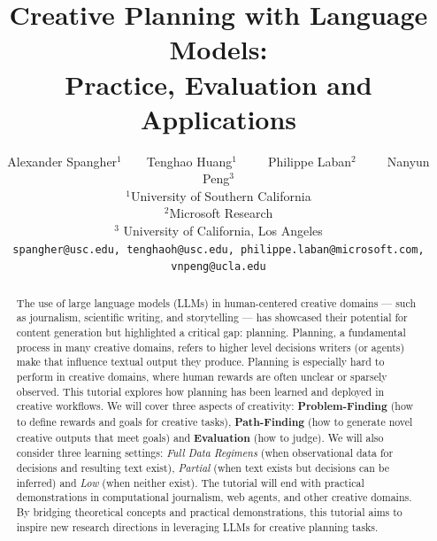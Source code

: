 \documentclass[11pt]{article}
\title{Creative Planning with Language Models: \\ Practice, Evaluation and Applications}
\author{Alexander Spangher$^1$~~~~Tenghao Huang$^{1}$~~~~~Philippe Laban$^{2}$~~~~~Nanyun Peng$^{3}$ \\
 $^1$University of Southern California\\  
 $^2$Microsoft Research\\
 $^3$ University of California, Los Angeles\\
 {\tt\small spangher@usc.edu, tenghaoh@usc.edu, philippe.laban@microsoft.com, vnpeng@ucla.edu} \\
}
\begin{document}
\maketitle
\begin{abstract}


The use of large language models (LLMs) in human-centered creative domains — such as journalism, scientific writing, and storytelling — has showcased their potential for content generation but highlighted a critical gap: planning. Planning, a fundamental process in many creative domains, refers to higher level decisions writers (or agents) make that influence textual output they produce. Planning is especially hard to perform in creative domains, where human rewards are often unclear or sparsely observed. This tutorial explores how planning has been learned and deployed in creative workflows. We will cover three aspects of creativity: \textbf{Problem-Finding} (how to define rewards and goals for creative tasks), \textbf{Path-Finding} (how to generate novel creative outputs that meet goals) and \textbf{Evaluation} (how to judge). We will also consider three learning settings: \textit{Full Data Regimens} (when observational data for decisions and resulting text exist), \textit{Partial} (when text exists but decisions can be inferred) and \textit{Low} (when neither exist). The tutorial will end with practical demonstrations in computational journalism, web agents, and other creative domains. By bridging theoretical concepts and practical demonstrations, this tutorial aims to inspire new research directions in leveraging LLMs for creative planning tasks.


\end{abstract}
\end{document}
